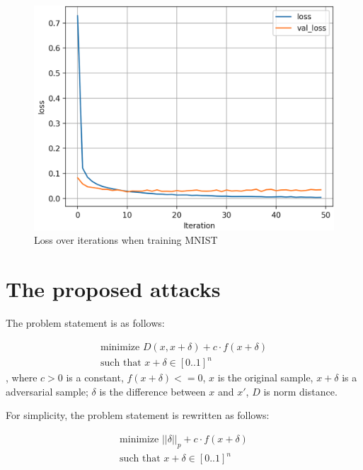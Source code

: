 \documentclass[12pt]{article}
\begin{document}
\begin{figure}[H]
	\centering
	\caption{Loss over iterations when training MNIST}
		\label{fig:MNIST-loss}
	\vspace{2mm}
	\includegraphics[scale=0.35]{img/MNIST_loss}
\end{figure}


\section{The proposed attacks}

The problem statement is as follows:

\begin{equation}
\begin{split}
\label{eqn:modified-adversarial-sample-formula-v2}
\text{minimize } D(x, x + \delta) + c \cdot f(x+\delta)
\\
\text{such that } x + \delta \in [0..1]^n
\end{split}
\end{equation}
, where $c > 0$ is a constant, $f(x+\delta) <= 0$, $x$ is the original sample, $x + \delta$ is a adversarial sample; $\delta$ is the difference between $x$ and $x'$, $D$ is norm distance.

For simplicity, the problem statement is rewritten as follows:

\begin{equation}
\begin{split}
\label{eqn:modified-adversarial-sample-formula-v6}
\text{minimize } ||\delta||_p + c \cdot f(x+\delta)
\\
\text{such that } x + \delta \in [0..1]^n
\end{split}
\end{equation}
\end{document}
